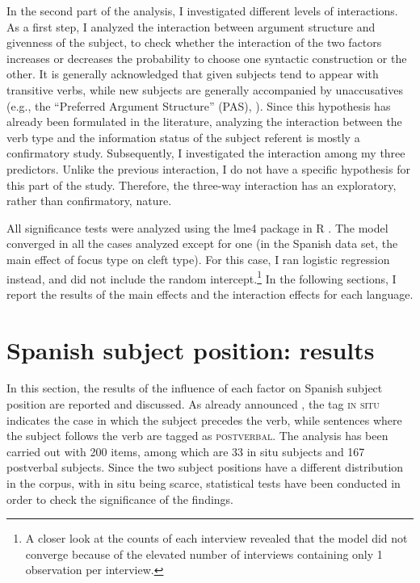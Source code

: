 In the second part of the analysis, I investigated different levels of interactions. As a first step, I analyzed the interaction between argument structure and givenness of the subject, to check whether the interaction of the two factors increases or decreases the probability to choose one syntactic construction or the other. It is generally acknowledged that given subjects tend to appear with transitive verbs, while new subjects are generally accompanied by unaccusatives (e.g., the ``Preferred Argument Structure” (PAS), \cite{du2003preferred}). Since this hypothesis has already been formulated in the literature, analyzing the interaction between the verb type and the information status of the subject referent is mostly a confirmatory study. Subsequently, I investigated the interaction among my three predictors. Unlike the previous interaction, I do not have a specific hypothesis for this part of the study. Therefore, the three-way interaction has an exploratory, rather than confirmatory, nature.

All significance tests were analyzed using the lme4 package \parencite{bates2014fitting} in R \parencite{rcoreteam19}. The model converged in all the cases analyzed except for one (in the Spanish data set, the main effect of focus type on cleft type). For this case, I ran logistic regression instead, and did not include the random intercept.\footnote{A closer look at the counts of each interview revealed that the model did not converge because of the elevated number of interviews containing only 1 observation per interview.} In the following sections, I report the results of the main effects and the interaction effects for each language.


\section{Spanish subject position: results} \label{sub:6.6}
In this section, the results of the influence of each factor on Spanish subject position are reported and discussed. As already announced , the tag \textsc{in situ} indicates the case in which the subject precedes the verb, while sentences where the subject follows the verb are tagged as \textsc{postverbal}. The analysis has been carried out with 200 items, among which are 33 in situ subjects and 167 postverbal subjects. Since the two subject positions have a different distribution in the corpus, with in situ being scarce, statistical tests have been conducted in order to check the significance of the findings.

